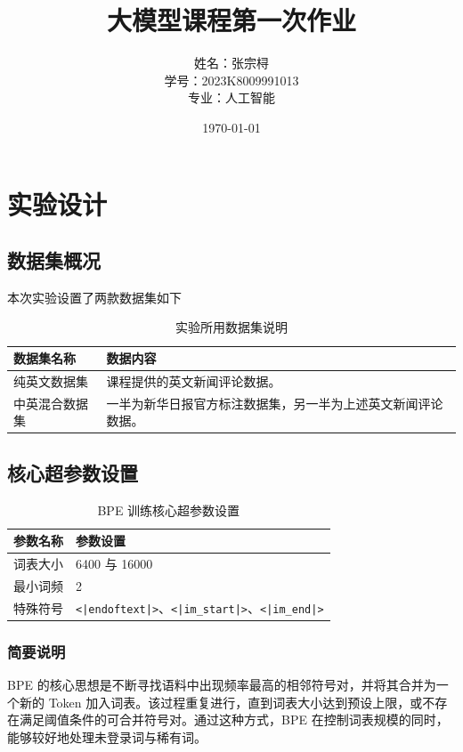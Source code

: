 \documentclass[a4paper,12pt]{ctexart} %
\title{\textbf{大模型课程第一次作业}}
\author{姓名：张宗桪 \\ 学号：2023K8009991013 \\ 专业：人工智能}
\date{\today}
\begin{document}
\pagestyle{plain} %

\maketitle
\thispagestyle{empty} %
\newpage

\tableofcontents
\newpage
\section{实验设计}


\subsection{数据集概况}
本次实验设置了两款数据集如下

\begin{table}[H]
    \centering
    \caption{实验所用数据集说明}
    \begin{tabular}{p{} p{}}
        \toprule
        数据集名称 & 数据内容 \\
        \midrule
        纯英文数据集 & 课程提供的英文新闻评论数据。 \\
        中英混合数据集 & 一半为新华日报官方标注数据集，另一半为上述英文新闻评论数据。 \\
        \bottomrule
    \end{tabular}
\end{table}

\subsection{核心超参数设置}

\begin{table}[H]
    \centering
    \caption{BPE 训练核心超参数设置}
    \begin{tabular}{p{} p{}}
        \toprule
        参数名称 & 参数设置 \\
        \midrule
        词表大小 & 6400 与 16000 \\
        最小词频 & 2 \\
        特殊符号 & \texttt{<|endoftext|>}、\texttt{<|im\_start|>}、\texttt{<|im\_end|>} \\

        \bottomrule
    \end{tabular}
\end{table}


\subsubsection{简要说明}
BPE 的核心思想是不断寻找语料中出现频率最高的相邻符号对，并将其合并为一个新的 Token 加入词表。该过程重复进行，直到词表大小达到预设上限，或不存在满足阈值条件的可合并符号对。通过这种方式，BPE 在控制词表规模的同时，能够较好地处理未登录词与稀有词。
\end{document}
